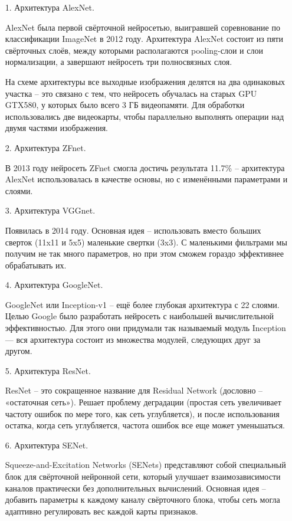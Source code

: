 \begin{enumerate}
\item[1.] Архитектура AlexNet.

AlexNet была первой свёрточной нейросетью, выигравшей соревнование по классификации ImageNet в 2012 году. Архитектура AlexNet состоит из пяти свёрточных слоёв, между которыми располагаются pooling-слои и слои нормализации, а завершают нейросеть три полносвязных слоя.

На схеме архитектуры все выходные изображения делятся на два одинаковых участка -- это связано с тем, что нейросеть обучалась на старых GPU GTX580, у которых было всего 3 ГБ видеопамяти. Для обработки использовались две видеокарты, чтобы параллельно выполнять операции над двумя частями изображения.

\item[2.] Архитектура ZFnet.

В 2013 году нейросеть ZFnet смогла достичь результата 11.7\% -- архитектура AlexNet использовалась в качестве основы, но с изменёнными параметрами и слоями. 

\item[3.] Архитектура VGGnet.

Появилась в 2014 году. Основная идея -- использовать вместо больших сверток (11x11 и 5x5) маленькие свертки (3x3). С маленькими фильтрами мы получим не так много параметров, но при этом сможем гораздо эффективнее обрабатывать их.

\item[4.] Архитектура GoogleNet.

GoogleNet или Inception-v1 -- ещё более глубокая архитектура с 22 слоями. Целью Google было разработать нейросеть с наибольшей вычислительной эффективностью. Для этого они придумали так называемый модуль Inception --- вся архитектура состоит из множества модулей, следующих друг за другом.

\item[5.] Архитектура ResNet.

ResNet -- это сокращенное название для Residual Network (дословно  -- «остаточная сеть»). Решает проблему деградации (простая сеть увеличивает частоту ошибок по мере того, как сеть углубляется), и после использования остатка, когда сеть углубляется, частота ошибок все еще может уменьшаться.

\item[6.] Архитектура SENet.

Squeeze-and-Excitation Networks (SENets) представляют собой специальный блок для свёрточной нейронной сети, который улучшает взаимозависимости каналов практически без дополнительных вычислений. Основная идея -- добавить параметры к каждому каналу свёрточного блока, чтобы сеть могла адаптивно регулировать вес каждой карты признаков. 

\end{enumerate}

